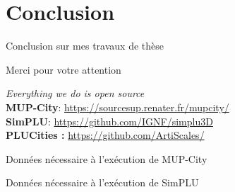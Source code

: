 \documentclass[xcolor=table]{beamer}
\begin{document}
\section{Conclusion}




\begin{frame}{Conclusion sur mes travaux de thèse}
		
\end{frame}

\begin{frame}[standout]
	\centering
	\begin{block}{}	
		\centering	
		Merci pour votre attention
	\end{block}
	\begin{block}{}
		\centering
		\textit{Everything we do is open source}\\
		\large
		\textbf{MUP-City}: \url{https://sourcesup.renater.fr/mupcity/} \\
		\textbf{SimPLU}: \url{https://github.com/IGNF/simplu3D}\\
		\textbf{PLUCities :} \url{https://github.com/ArtiScales/}  
	\end{block}
\end{frame}

\begin{frame}{Données nécessaire à l'exécution de MUP-City}
\end{frame}
\begin{frame}{Données nécessaire à l'exécution de SimPLU}
\end{frame}
\end{document}
